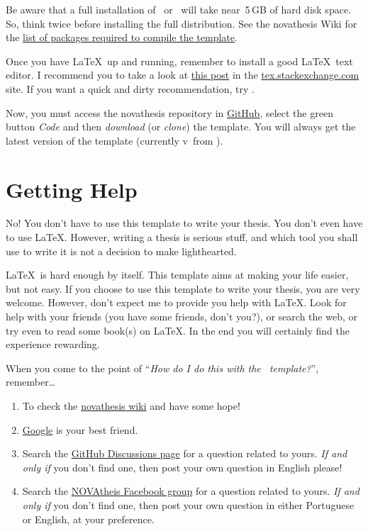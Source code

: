 Be aware that a full installation of \MikTeX\ or \TeXLive\ will take near~5\,GB of hard disk space.  So, think twice before installing the full distribution.  See the \gls{novathesis} Wiki for the \href{https://github.com/joaomlourenco/novathesis/wiki/installing-latex#minimal-installation-in-any-of-the-systems-above}{list of packages required to compile the template}.

Once you have \LaTeX\ up and running, remember to install a good \LaTeX\ text editor.  I recommend you to take a look at  \href{https://tex.stackexchange.com/questions/339/latex-editors-ides}{this post} in the \url{tex.stackexchange.com} site.  If you want a quick and dirty recommendation, try \href{https://www.texstudio.org/}{}.

Now, you must access the \gls{novathesis} repository in \href{https://github.com/joaomlourenco/novathesis}{GitHub}, select the green button \emph{Code} and then \emph{download} (or \emph{clone}) the template.  You will always get the latest version of the template (currently v\novathesisversion\ from \novathesisdate).


\section{Getting Help}
\label{sec:getting_help}

\ntindex[Help]{}

No! You don't have to use this template to write your thesis.  You don't even have to use \LaTeX.  However, writing a thesis is serious stuff, and which tool you shall use to write it is not a decision to make lighthearted.

\LaTeX\ is hard enough by itself.  This template aims at making your life easier, but not easy. If you choose to use this template to write your thesis, you are very welcome.  However, don't expect me to provide you help with \LaTeX.  Look for help with your friends (you have some friends, don't you?), or search the web, or try even to read some book(s) on \LaTeX. In the end you will certainly find the experience rewarding.

When you come to the point of “\emph{How do I do this with the \novathesis\ template?}”, remember…

\begin{enumerate}
  \item To check the \href{https://github.com/joaomlourenco/novathesis/wiki}{\gls{novathesis} wiki} and have some hope!  \emojiSmile
  \item \href{https://www.google.com}{Google} is your best friend.
  \item Search the \href{https://github.com/joaomlourenco/novathesis/discussions}{GitHub Discussions page} for a question related to yours.  \emph{If and only if} you don't find one, then post your own question in English please!
  \item Search the \href{https://www.facebook.com/groups/novathesis}{NOVAtheis Facebook group} for a question related to yours.  \emph{If and only if} you don't find one, then post your own question in either Portuguese or English, at your preference.
\end{enumerate}

